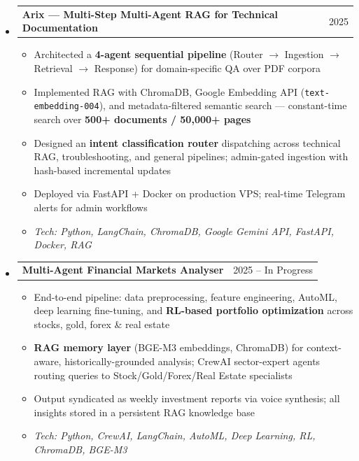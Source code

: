 \documentclass[11pt,a4paper]{article}
\makeatletter
\newcommand{\subspace}{\vspace{0.5em}}
\newcommand{\headerrow}[2]{
    \begin{tabular*}{\linewidth}{l@{\extracolsep{\fill}}r}
    #1 & \textcolor{primary}{#2} \\
    \end{tabular*}
}
\makeatother
\begin{document}
\begin{itemize}[leftmargin=1em, label={}]

    \item
    \headerrow{\textbf{Arix — Multi-Step Multi-Agent RAG for Technical Documentation}}{2025}
    \begin{itemize}[leftmargin=1.5em, label=$\bullet$, nosep]
        \item Architected a \textbf{4-agent sequential pipeline} (Router $\to$ Ingestion $\to$ Retrieval $\to$ Response) for domain-specific QA over PDF corpora
        \item Implemented RAG with ChromaDB, Google Embedding API (\texttt{text-embedding-004}), and metadata-filtered semantic search — constant-time search over \textbf{500+ documents / 50,000+ pages}
        \item Designed an \textbf{intent classification router} dispatching across technical RAG, troubleshooting, and general pipelines; admin-gated ingestion with hash-based incremental updates
        \item Deployed via FastAPI + Docker on production VPS; real-time Telegram alerts for admin workflows
        \item \emph{Tech: Python, LangChain, ChromaDB, Google Gemini API, FastAPI, Docker, RAG}
    \end{itemize}

    \subspace
    \item
    \headerrow{\textbf{Multi-Agent Financial Markets Analyser}}{2025 -- In Progress}
    \begin{itemize}[leftmargin=1.5em, label=$\bullet$, nosep]
        \item End-to-end pipeline: data preprocessing, feature engineering, AutoML, deep learning fine-tuning, and \textbf{RL-based portfolio optimization} across stocks, gold, forex \& real estate
        \item \textbf{RAG memory layer} (BGE-M3 embeddings, ChromaDB) for context-aware, historically-grounded analysis; CrewAI sector-expert agents routing queries to Stock/Gold/Forex/Real Estate specialists
        \item Output syndicated as weekly investment reports via voice synthesis; all insights stored in a persistent RAG knowledge base
        \item \emph{Tech: Python, CrewAI, LangChain, AutoML, Deep Learning, RL, ChromaDB, BGE-M3}
    \end{itemize}


\end{itemize}
\end{document}
